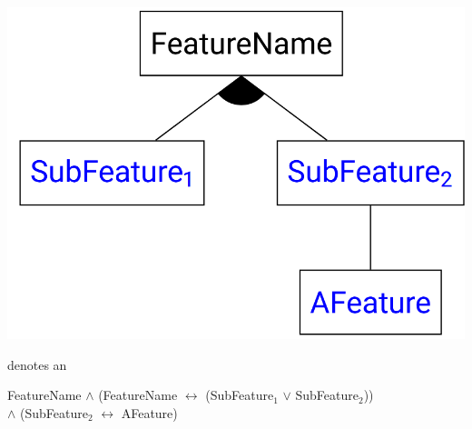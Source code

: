 \documentclass[
    ../../Software_Engineering_Summary.tex,
]
{subfiles}
\begin{document}
\begin{minipage}
    [c]{0.35\textwidth}
    \centering
    \includegraphics[width = \textwidth]{Pics/12/FeatureDiagramOR.png}
\end{minipage}
\begin{minipage}
    [c]{0.65\textwidth}
     denotes an 

    \begin{defbox}
        FeatureName $\land$ (FeatureName $\leftrightarrow$ (SubFeature$_1$ $\lor$ SubFeature$_2$))\\ $\land$ (SubFeature$_2$ $\leftrightarrow$ AFeature)
    \end{defbox}
\end{minipage}
\end{document}
